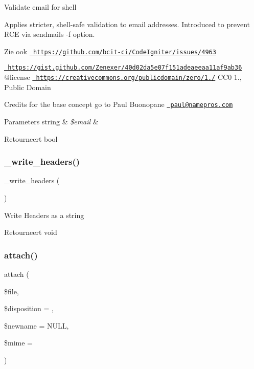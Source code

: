 Validate email for shell

Applies stricter, shell-\/safe validation to email addresses. Introduced to prevent R\+CE via sendmail\textquotesingle{}s -\/f option.

\begin{DoxySeeAlso}{Zie ook}
\href{https://github.com/bcit-ci/CodeIgniter/issues/4963}{\texttt{ https\+://github.\+com/bcit-\/ci/\+Code\+Igniter/issues/4963}} 

\href{https://gist.github.com/Zenexer/40d02da5e07f151adeaeeaa11af9ab36}{\texttt{ https\+://gist.\+github.\+com/\+Zenexer/40d02da5e07f151adeaeeaa11af9ab36}} @license \href{https://creativecommons.org/publicdomain/zero/1.0/}{\texttt{ https\+://creativecommons.\+org/publicdomain/zero/1./}} C\+C0 1., Public Domain
\end{DoxySeeAlso}
Credits for the base concept go to Paul Buonopane \href{mailto:paul@namepros.com}{\texttt{ paul@namepros.\+com}}


\begin{DoxyParams}[1]{Parameters}
string & {\em \$email} & \\
\hline
\end{DoxyParams}
\begin{DoxyReturn}{Retourneert}
bool 
\end{DoxyReturn}
\mbox{\label{class_c_i___email_a6bde7269215bc1093811ae098bb034bf}} 
\subsubsection{\texorpdfstring{\_write\_headers()}{\_write\_headers()}}
{\footnotesize\ttfamily \+\_\+write\+\_\+headers (\begin{DoxyParamCaption}{ }\end{DoxyParamCaption})\hspace{0.3cm}{\ttfamily [protected]}}

Write Headers as a string

\begin{DoxyReturn}{Retourneert}
void 
\end{DoxyReturn}
\mbox{\label{class_c_i___email_adb1bcf392d6cf38e3f94675a21cab563}} 
\subsubsection{\texorpdfstring{attach()}{attach()}}
{\footnotesize\ttfamily attach (\begin{DoxyParamCaption}\item[{}]{\$file,  }\item[{}]{\$disposition = {\ttfamily \textquotesingle{}\textquotesingle{}},  }\item[{}]{\$newname = {\ttfamily NULL},  }\item[{}]{\$mime = {\ttfamily \textquotesingle{}\textquotesingle{}} }\end{DoxyParamCaption})}

